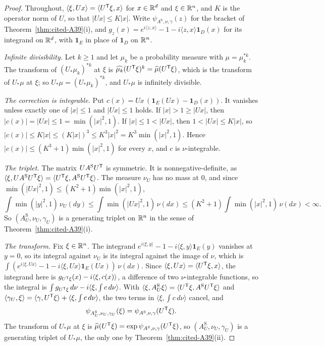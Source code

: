 \begin{proof}
Throughout, $\langle \xi, Ux\rangle = \langle U^{\mathsf{T}}\xi, x\rangle$ for $x \in \mathbb{R}^d$ and
$\xi \in \mathbb{R}^n$, and $K$ is the operator norm of $U$, so that $|Ux| \le K|x|$. Write
$\psi_{A^{\mathrm S},\nu,\gamma}(z)$ for the bracket of Theorem~\ref{thm:cited-A39}(i), and
$g_z(x) = e^{i\langle z,x\rangle} - 1 - i\langle z,x\rangle\mathbf{1}_D(x)$ for its integrand on
$\mathbb{R}^d$, with $\mathbf{1}_E$ in place of $\mathbf{1}_D$ on $\mathbb{R}^n$.

\emph{Infinite divisibility.} Let $k \ge 1$ and let $\mu_k$ be a probability measure with
$\mu = \mu_k^{*k}$. The transform of $(U_*\mu_k)^{*k}$ at $\xi$ is
$\widehat{\mu_k}(U^{\mathsf{T}}\xi)^k = \widehat\mu(U^{\mathsf{T}}\xi)$, which is the transform of $U_*\mu$ at $\xi$; so
$U_*\mu = (U_*\mu_k)^{*k}$, and $U_*\mu$ is infinitely divisible.

\emph{The correction is integrable.} Put $c(x) = Ux\,(\mathbf{1}_E(Ux) - \mathbf{1}_D(x))$. It
vanishes unless exactly one of $|x| \le 1$ and $|Ux| \le 1$ holds. If $|x| > 1 \ge |Ux|$, then
$|c(x)| = |Ux| \le 1 = \min(|x|^2, 1)$. If $|x| \le 1 < |Ux|$, then $1 < |Ux| \le K|x|$, so
$|c(x)| \le K|x| \le (K|x|)^3 \le K^3|x|^2 = K^3\min(|x|^2, 1)$. Hence
$|c(x)| \le (K^3 + 1)\min(|x|^2, 1)$ for every $x$, and $c$ is $\nu$-integrable.

\emph{The triplet.} The matrix $UA^{\mathrm S}U^{\mathsf{T}}$ is symmetric. It is nonnegative-definite, as
$\langle \xi, UA^{\mathrm S}U^{\mathsf{T}}\xi\rangle = \langle U^{\mathsf{T}}\xi, A^{\mathrm S}U^{\mathsf{T}}\xi\rangle$. The measure
$\nu_U$ has no mass at $0$, and since $\min(|Ux|^2, 1) \le (K^2 + 1)\min(|x|^2, 1)$,
\[
  \int \min(|y|^2, 1)\,\nu_U(dy) \le \int \min(|Ux|^2, 1)\,\nu(dx)
  \le (K^2 + 1)\int \min(|x|^2, 1)\,\nu(dx) < \infty .
\]
So $(A^{\mathrm S}_U, \nu_U, \gamma_U)$ is a generating triplet on $\mathbb{R}^n$ in the sense of
Theorem~\ref{thm:cited-A39}(i).

\emph{The transform.} Fix $\xi \in \mathbb{R}^n$. The integrand $e^{i\langle \xi,y\rangle} - 1 - i\langle \xi,y\rangle\mathbf{1}_E(y)$
vanishes at $y = 0$, so its integral against $\nu_U$ is its integral against the image of $\nu$,
which is $\int (e^{i\langle \xi,Ux\rangle} - 1 - i\langle \xi,Ux\rangle\mathbf{1}_E(Ux))\,\nu(dx)$. Since
$\langle \xi, Ux\rangle = \langle U^{\mathsf{T}}\xi, x\rangle$, the integrand here is
$g_{U^{\mathsf{T}}\xi}(x) - i\langle \xi, c(x)\rangle$, a difference of two $\nu$-integrable functions, so the
integral is $\int g_{U^{\mathsf{T}}\xi}\,d\nu - i\langle \xi, \int c\,d\nu\rangle$. With
$\langle \xi, A^{\mathrm S}_U \xi\rangle = \langle U^{\mathsf{T}}\xi, A^{\mathrm S}U^{\mathsf{T}}\xi\rangle$ and
$\langle \gamma_U, \xi\rangle = \langle \gamma, U^{\mathsf{T}}\xi\rangle + \langle \xi, \int c\,d\nu\rangle$, the
two terms in $\langle \xi, \int c\,d\nu\rangle$ cancel, and
\[
  \psi_{A^{\mathrm S}_U,\nu_U,\gamma_U}(\xi) = \psi_{A^{\mathrm S},\nu,\gamma}(U^{\mathsf{T}}\xi).
\]
The transform of $U_*\mu$ at $\xi$ is $\widehat\mu(U^{\mathsf{T}}\xi) = \exp\psi_{A^{\mathrm S},\nu,\gamma}(U^{\mathsf{T}}\xi)$,
so $(A^{\mathrm S}_U, \nu_U, \gamma_U)$ is a generating triplet of $U_*\mu$, the only one by
Theorem~\ref{thm:cited-A39}(ii).


\end{proof}
